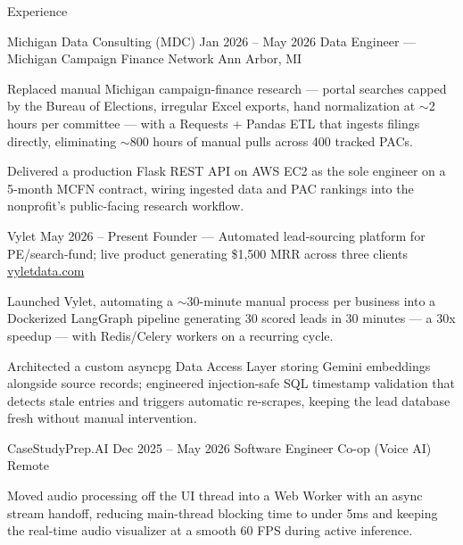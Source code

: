 \documentclass[
	11pt
]{../../../template}
\begin{document}
	\begin{rSection}{E}{xperience}
		\begin{rSectionEntry}
			{Michigan Data Consulting (MDC)}
			{Jan 2026 -- May 2026}
			{Data Engineer --- Michigan Campaign Finance Network}
			{}
			{Ann Arbor, MI}

			\item Replaced manual Michigan campaign-finance research --- portal searches capped by the Bureau of Elections, irregular Excel exports, hand normalization at $\sim$2 hours per committee --- with a Requests + Pandas ETL that ingests filings directly, eliminating $\sim$800 hours of manual pulls across 400 tracked PACs.
			\item Delivered a production Flask REST API on AWS EC2 as the sole engineer on a 5-month MCFN contract, wiring ingested data and PAC rankings into the nonprofit's public-facing research workflow.
		\end{rSectionEntry}

		\begin{rSectionEntry}
			{Vylet}
			{May 2026 -- Present}
			{Founder --- Automated lead-sourcing platform for PE/search-fund; live product generating \$1,500 MRR across three clients}
			{}
			{\href{https://vyletdata.com}{vyletdata.com}}

			\item Launched Vylet, automating a $\sim$30-minute manual process per business into a Dockerized LangGraph pipeline generating 30 scored leads in 30 minutes --- a 30x speedup --- with Redis/Celery workers on a recurring cycle.
			\item Architected a custom asyncpg Data Access Layer storing Gemini embeddings alongside source records; engineered injection-safe SQL timestamp validation that detects stale entries and triggers automatic re-scrapes, keeping the lead database fresh without manual intervention.
		\end{rSectionEntry}

		\begin{rSectionEntry}
			{CaseStudyPrep.AI}
			{Dec 2025 -- May 2026}
			{Software Engineer Co-op (Voice AI)}
			{}
			{Remote}

			\item Moved audio processing off the UI thread into a Web Worker with an async stream handoff, reducing main-thread blocking time to under 5ms and keeping the real-time audio visualizer at a smooth 60 FPS during active inference.
		\end{rSectionEntry}
	\end{rSection}
\end{document}
